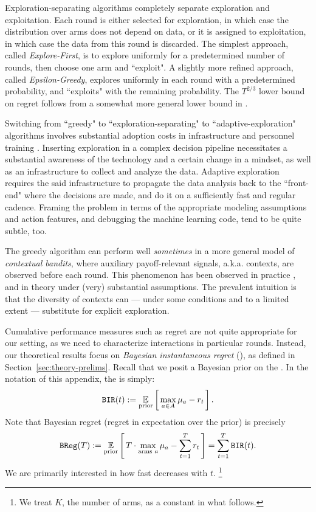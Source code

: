 Exploration-separating algorithms completely separate exploration and exploitation. Each round is either selected for exploration, in which case  the distribution over arms does not depend on data, or it is assigned to exploitation, in which case the data from this round is discarded. The simplest approach, called \emph{Explore-First}, is to explore uniformly for a predetermined number of rounds, then choose one arm and ``exploit". A slightly more refined approach, called \emph{Epsilon-Greedy}, explores uniformly in each round with a predetermined probability, and ``exploits" with the remaining probability. The $T^{2/3}$ lower bound on regret follows from a somewhat more general lower bound in \citet{MechMAB-ec09}.

Switching from ``greedy" to ``exploration-separating" to ``adaptive-exploration" algorithms involves substantial adoption costs in infrastructure and personnel training \citep{DS-arxiv}. Inserting exploration in a complex decision pipeline necessitates a substantial awareness of the technology and a certain change in a mindset, as well as an infrastructure to collect and analyze the data. Adaptive exploration requires the said infrastructure to propagate the data analysis back to the ``front-end" where the decisions are made, and do it on a sufficiently fast and regular cadence. Framing the problem in terms of the appropriate modeling assumptions and action features, and debugging the machine learning code, tend to be quite subtle, too.

The greedy algorithm can perform well \emph{sometimes} in a more general model of \emph{contextual bandits}, where auxiliary payoff-relevant signals, a.k.a. contexts, are observed before each round. This phenomenon has been observed in practice
\citep{practicalCB-arxiv18}, and in theory \citep{kannan2018smoothed,bastani2017exploiting,externalities-colt18} under (very) substantial assumptions. The prevalent intuition is that the diversity of contexts can --- under some conditions and to a limited extent --- substitute for explicit exploration.

Cumulative performance measures such as regret are not quite appropriate for our setting, as we need to characterize interactions in particular rounds. Instead, our theoretical results focus on \emph{Bayesian instantaneous regret} (\BIR), as defined in Section~\ref{sec:theory-prelims}. Recall that we posit a Bayesian prior on the \MRVs. In the notation of this appendix, the \BIR is simply:
\begin{align*}%
\BIR(t) := \E_{\text{prior}}\sbr{ \max_{a\in A} \mu_a - r_t}.
\end{align*}
\noindent Note that Bayesian regret (\ie regret in expectation over the prior) is precisely
\begin{align}\label{eq:bg-BReg}
  \BReg(T):=
    \E_{\text{prior}}\sbr{ T\cdot \max_{\text{arms $a$}}\mu_a - \sum_{t=1}^T r_t }
    = \sum_{t=1}^T \BIR(t).
\end{align}
We are primarily interested in how fast \BIR decreases with $t$.%
\footnote{We treat $K$, the number of arms, as a constant in what follows.}


